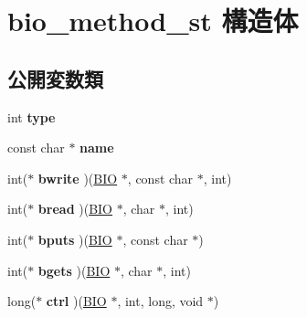 \hypertarget{structbio__method__st}{}\section{bio\+\_\+method\+\_\+st 構造体}
\label{structbio__method__st}
\subsection*{公開変数類}
\begin{DoxyCompactItemize}
\item 
\hypertarget{structbio__method__st_aa17907bd09e726ddc073966bdd224b5b}{}int {\bfseries type}\label{structbio__method__st_aa17907bd09e726ddc073966bdd224b5b}

\item 
\hypertarget{structbio__method__st_af69506d10c7b6ee584d7ebf99a1b84ba}{}const char $\ast$ {\bfseries name}\label{structbio__method__st_af69506d10c7b6ee584d7ebf99a1b84ba}

\item 
\hypertarget{structbio__method__st_ae24e468c844e654724faccdc87d88a62}{}int($\ast$ {\bfseries bwrite} )(\hyperlink{structbio__st}{B\+I\+O} $\ast$, const char $\ast$, int)\label{structbio__method__st_ae24e468c844e654724faccdc87d88a62}

\item 
\hypertarget{structbio__method__st_aa92125381017c6b2641439943cce9072}{}int($\ast$ {\bfseries bread} )(\hyperlink{structbio__st}{B\+I\+O} $\ast$, char $\ast$, int)\label{structbio__method__st_aa92125381017c6b2641439943cce9072}

\item 
\hypertarget{structbio__method__st_a733f66ebc2d8c513c6a286ffbc629428}{}int($\ast$ {\bfseries bputs} )(\hyperlink{structbio__st}{B\+I\+O} $\ast$, const char $\ast$)\label{structbio__method__st_a733f66ebc2d8c513c6a286ffbc629428}

\item 
\hypertarget{structbio__method__st_a8fae124b9b9854cb1dfbee68db660b30}{}int($\ast$ {\bfseries bgets} )(\hyperlink{structbio__st}{B\+I\+O} $\ast$, char $\ast$, int)\label{structbio__method__st_a8fae124b9b9854cb1dfbee68db660b30}

\item 
\hypertarget{structbio__method__st_ad0b4e0005a2dc107eb04a0dbec8f26b6}{}long($\ast$ {\bfseries ctrl} )(\hyperlink{structbio__st}{B\+I\+O} $\ast$, int, long, void $\ast$)\label{structbio__method__st_ad0b4e0005a2dc107eb04a0dbec8f26b6}


\end{DoxyCompactItemize}
